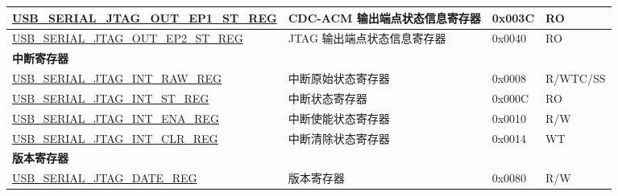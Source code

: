 \begin{longtable}{ | p{6cm} | p{7.2cm} | p{1.3cm} | p{1cm} | }
\hyperref[regdesc:USBSERIALJTAGOUTEP1STREG]{USB\_SERIAL\_JTAG\_OUT\_EP1\_ST\_REG} & CDC-ACM 输出端点状态信息寄存器 & 0x003C & RO \\ \hline
\hyperref[regdesc:USBSERIALJTAGOUTEP2STREG]{USB\_SERIAL\_JTAG\_OUT\_EP2\_ST\_REG} & JTAG 输出端点状态信息寄存器 & 0x0040 & RO \\ \hline
\multicolumn{4}{|l|}{\textbf{中断寄存器}} \\ \hline
\hyperref[regdesc:USBSERIALJTAGINTRAWREG]{USB\_SERIAL\_JTAG\_INT\_RAW\_REG} & 中断原始状态寄存器 & 0x0008 & R/WTC/SS \\ \hline
\hyperref[regdesc:USBSERIALJTAGINTSTREG]{USB\_SERIAL\_JTAG\_INT\_ST\_REG} & 中断状态寄存器 & 0x000C & RO \\ \hline
\hyperref[regdesc:USBSERIALJTAGINTENAREG]{USB\_SERIAL\_JTAG\_INT\_ENA\_REG} & 中断使能状态寄存器 & 0x0010 & R/W \\ \hline
\hyperref[regdesc:USBSERIALJTAGINTCLRREG]{USB\_SERIAL\_JTAG\_INT\_CLR\_REG} & 中断清除状态寄存器 & 0x0014 & WT \\ \hline
\multicolumn{4}{|l|}{\textbf{版本寄存器}} \\ \hline
\hyperref[regdesc:USBSERIALJTAGDATEREG]{USB\_SERIAL\_JTAG\_DATE\_REG} & 版本寄存器 & 0x0080 & R/W \\ \hline
\end{longtable}
